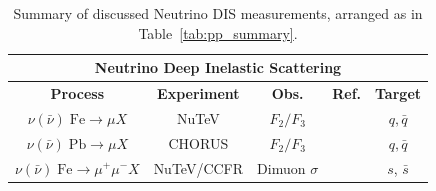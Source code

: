 \documentclass[12pt,twoside,openright]{report}
\begin{document}
\begin{spacing}{1.5}
\begin{table}
\begin{center}
\begin{tabular}{|c|c|c|c|c|}
\hline
\multicolumn{5}{|c|}{\textbf{Neutrino Deep Inelastic Scattering}}\\
\hline
\textbf{Process} & \textbf{Experiment} & \textbf{Obs.} &\textbf{Ref.} &  \textbf{Target} \\
\hline\hline
$\nu(\bar{\nu})\; \mathrm{ Fe} \to \mu X$ & NuTeV & $F_2/F_3$ & \cite{Tzanov:2005kr} & $q, \bar{q}$\\
$\nu(\bar{\nu})\; \mathrm{ Pb} \to \mu X$ & CHORUS & $F_2/F_3$ & \cite{Onengut:2005kv} & $q, \bar{q}$ \\
\hline
$\nu(\bar\nu)\; \mathrm{ Fe}  \to \mu^+\mu^- X$ & NuTeV/CCFR & Dimuon $\sigma$ & \cite{Goncharov:2001qe} & $s$, $\bar{s}$ \\
\hline
\end{tabular}
\end{center}
\label{tab:NUDIS_summary}
\caption{Summary of discussed Neutrino DIS measurements, arranged as in Table~\ref{tab:pp_summary}.}
\end{table}%



\end{spacing}
\end{document}
